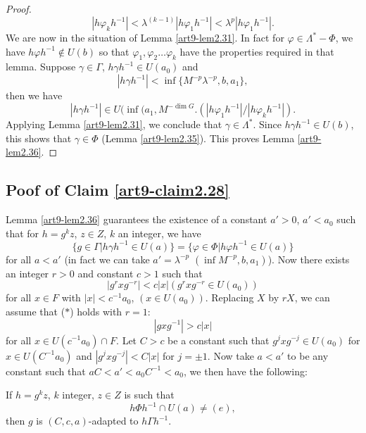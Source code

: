 \begin{proof}
$$
|h \varphi_k h^{-1}| < \lambda^{(k-1)} |h \varphi_1 h^{-1}| < \lambda^p |h \varphi_1 h^{-1}|.
$$
We are now in the situation of Lemma \ref{art9-lem2.31}. In fact for $\varphi \in \Lambda^\ast - \Phi$, we have $h \varphi h^{-1} \not\in U (b)$ so that $\varphi_1, \varphi_2 \ldots \varphi_k$ have the properties required in that lemma. Suppose $\gamma \in \Gamma$, $h \gamma h^{-1} \in U (a_0)$  and
$$
|h \gamma h^{-1}| < \inf \{ M^{-p} \lambda^{-p}, b, a_1\},
$$
then we have 
$$
|h \gamma h^{-1}| \in U (\inf (a_1, M^{-\dim G}. (|h \varphi_1 h^{-1}| / |h\varphi_k h^{-1}|).
$$
Applying Lemma \ref{art9-lem2.31}, we conclude that $\gamma \in \Lambda^\ast$. Since $h \gamma h^{-1} \in U (b)$, this shows that $\gamma \in \Phi$ (Lemma \ref{art9-lem2.35}). This proves Lemma \ref{art9-lem2.36}.
\end{proof}

\setcounter{subsection}{36}
\subsection{Poof of Claim \protect\ref{art9-claim2.28}}\label{art9-subsec2.37}
 Lemma \ref{art9-lem2.36} guarantees the existence of a constant $a'> 0$, $a' < a_0$ such that for $h = g^kz$, $z \in Z$, $k$ an integer, we have
$$
\{g \in \Gamma \big| h \gamma h^{-1} \in U (a)\} = \{\varphi \in \Phi \big| h \varphi h^{-1} \in U (a)\}
$$
for all $a< a'$ (in fact we can take $a' = \lambda^{-p}$ $(\inf M^{-p}, b, a_1)$). Now there exists an integer $r >0$ and constant $c >1$ such that
\begin{equation*}
|g^r x g^{-r}| < c |x| (g^r x g^{-r} \in U (a_0)) 
\tag*{($\ast$)}
\end{equation*}
for all $x \in F$ with $|x| < c^{-1} a_0$, $(x \in U (a_0))$. Replacing $X$ by $rX$, we can assume that ($\ast$) holds with $r = 1$:
\begin{equation*}
|gx g^{-1}| > c|x| \tag*{($\ast\ast$)}
\end{equation*}
for all $x \in U (c^{-1} a_0) \cap F$. Let $C > c$ be a constant such that $g^j x g^{-j} \in U (a_0)$ for $x \in U (C^{-1} a_0)$ and $|g^j x g^{-j}| < C|x|$ for $j =\pm 1$. Now take $a < a'$ to be any constant such that $a C < a' < a_0 C^{-1} < a_0$, we then have the following:

\setcounter{definition}{37}
\begin{assertion}\label{art9-asser2.38}
If $h = g^kz$, $k$ integer, $z \in Z$ is such that 
$$
h \Phi h^{-1} \cap U (a) \neq (e),
$$
then $g$ is $(C, c, a)$-adapted to $h \Gamma h^{-1}$.
\end{assertion}

